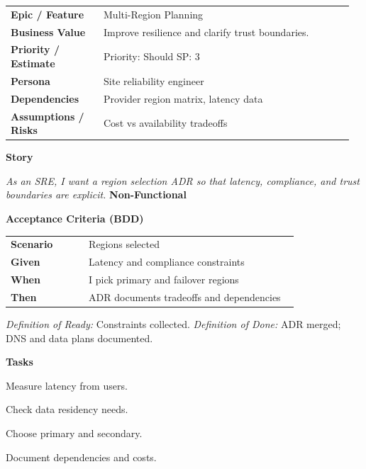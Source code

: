 \documentclass[11pt,letterpaper]{article}
\makeatletter
\newenvironment{kvtable}{%
  \begin{tabular}{@{}>{\bfseries\arraybackslash}p{0.26\linewidth} p{0.70\linewidth}@{}}
}{\end{tabular}}
\newenvironment{bdd}{%
  \begin{tabular}{@{}>{\bfseries\arraybackslash}p{0.26\linewidth} p{0.70\linewidth}@{}}
}{\end{tabular}}
\newcommand{\DoRDoD}[2]{%
  \vspace{0.35em}
  {\footnotesize\color{Muted}%
    \textit{Definition of Ready:} #1 \; \textbullet\;
    \textit{Definition of Done:} #2%
  }%
}
\newenvironment{storycard}[2]{%
  \begin{tcolorbox}[cloudcard, title={#1 --- #2}]%
}{\end{tcolorbox}}
\newcommand{\sectionlabel}[1]{\vspace{0.35em}\textbf{#1}\par}
\makeatother
\begin{document}
\begin{storycard}{CCS-29}{Ch. 29 — Regions, Zones, \& Trust Boundaries}
\begin{kvtable}
Epic / Feature & Multi-Region Planning\\
Business Value & Improve resilience and clarify trust boundaries.\\
Priority / Estimate & Priority: Should \quad SP: 3\\
Persona & Site reliability engineer\\
Dependencies & Provider region matrix, latency data\\
Assumptions / Risks & Cost vs availability tradeoffs\\
\end{kvtable}
\sectionlabel{Story}
\textit{As an SRE, I want a region selection ADR so that latency, compliance, and trust boundaries are explicit.}
\sectionlabel{Non-Functional}\;
\sectionlabel{Acceptance Criteria (BDD)}
\begin{bdd}
Scenario & Regions selected\\
Given & Latency and compliance constraints\\
When & I pick primary and failover regions\\
Then & ADR documents tradeoffs and dependencies\\
\end{bdd}
\DoRDoD{Constraints collected.}{ADR merged; DNS and data plans documented.}
\sectionlabel{Tasks}
\begin{checklist}
\item Measure latency from users.
\item Check data residency needs.
\item Choose primary and secondary.
\item Document dependencies and costs.
\end{checklist}
\end{storycard}
\end{document}
